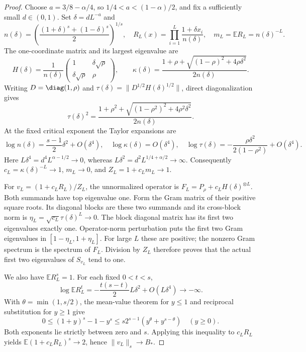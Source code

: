 \begin{proof}
Choose $a=3/8-\alpha/4$, so $1/4<a<(1-\alpha)/2$, and fix a
sufficiently small $d\in(0,1)$. Set $\delta=dL^{-a}$ and
\[
 n(\delta)=\left(\frac{(1+\delta)^s+(1-\delta)^s}{2}\right)^{1/s},
 \quad R_L(x)=\prod_{i=1}^L\frac{1+\delta x_i}{n(\delta)},
 \quad m_L=\mathbb E R_L=n(\delta)^{-L}.
\]
The one-coordinate matrix and its largest eigenvalue are
\[
 H(\delta)=\frac1{n(\delta)}
 \begin{pmatrix}1&\delta\sqrt\rho\\\delta\sqrt\rho&\rho\end{pmatrix},
 \qquad
 \kappa(\delta)=\frac{1+\rho+
 \sqrt{(1-\rho)^2+4\rho\delta^2}}{2n(\delta)}.
\]
Writing $D=\diag(1,\rho)$ and
$\tau(\delta)=\|D^{1/2}H(\delta)^{1/2}\|$, direct diagonalization gives
\[
 \tau(\delta)^2=\frac{1+\rho^2+
 \sqrt{(1-\rho^2)^2+4\rho^2\delta^2}}{2n(\delta)}.
\]
At the fixed critical exponent the Taylor expansions are
\[
 \log n(\delta)=\frac{s-1}{2}\delta^2+O(\delta^4),\quad
 \log\kappa(\delta)=O(\delta^4),\quad
 \log\tau(\delta)=-\frac{\rho\delta^2}{2(1-\rho^2)}+O(\delta^4).
\]
Here $L\delta^4=d^4L^{\alpha-1/2}\to0$, whereas
$L\delta^2=d^2L^{1/4+\alpha/2}\to\infty$.
Consequently $c_L=\kappa(\delta)^{-L}\to1$, $m_L\to0$, and
$Z_L=1+c_Lm_L\to1$.

For $v_L=(1+c_LR_L)/Z_L$, the unnormalized operator is
$F_L=P_\rho+c_LH(\delta)^{\otimes L}$. Both summands have top
eigenvalue one. Form the Gram matrix of their positive square roots.
Its diagonal blocks are these two summands and its cross-block norm is
$\eta_L=\sqrt{c_L}\tau(\delta)^L\to0$. The block diagonal matrix has
its first two eigenvalues exactly one. Operator-norm perturbation puts
the first two Gram eigenvalues in $[1-\eta_L,1+\eta_L]$.
For large $L$ these are positive; the nonzero Gram spectrum is the spectrum
of $F_L$. Division by $Z_L$ therefore proves that the actual first two
eigenvalues of $S_{v_L}$ tend to one.

We also have $\mathbb E R_L^s=1$. For each fixed $0<t<s$,
\[
 \log\mathbb E R_L^t=-\frac{t(s-t)}2L\delta^2+O(L\delta^4)
 \longrightarrow-\infty.
\]
With $\theta=\min(1,s/2)$, the mean-value theorem for $y\leq1$ and
reciprocal substitution for $y\geq1$ give
\[
 0\leq(1+y)^s-1-y^s\leq
 s2^{s-1}(y^\theta+y^{s-\theta})\quad(y\geq0).
\]
Both exponents lie strictly between zero and $s$. Applying this inequality
to $c_LR_L$ yields $\mathbb E(1+c_LR_L)^s\to2$, hence
$\|v_L\|_s\to B_*$.


\end{proof}
